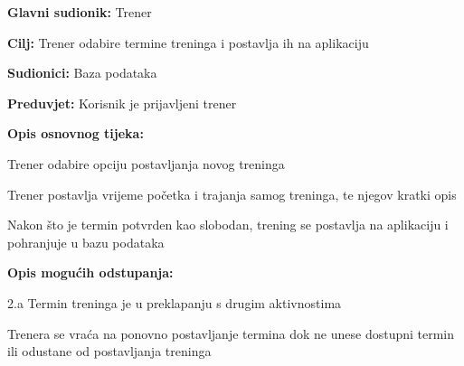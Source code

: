 \documentclass{article}
\begin{document}
		\begin{packed_item}
			
			\item \textbf{Glavni sudionik: }Trener
			\item  \textbf{Cilj:} Trener odabire termine treninga i postavlja ih na aplikaciju   
			\item  \textbf{Sudionici:} Baza podataka
			\item  \textbf{Preduvjet:} Korisnik je prijavljeni trener 
			\item  \textbf{Opis osnovnog tijeka:}
			
			\item[] \begin{packed_enum}
				\item Trener odabire opciju postavljanja novog treninga  
				\item Trener postavlja vrijeme početka i trajanja samog treninga, te njegov kratki opis 
				\item Nakon što je termin potvrden kao slobodan, trening se postavlja na aplikaciju i pohranjuje u bazu podataka 
			\end{packed_enum}
			
			\item  \textbf{Opis mogućih odstupanja:}
			
			\item[] \begin{packed_item}
				
				\item[2.a] Termin treninga je u preklapanju s drugim aktivnostima
				\item[] \begin{packed_enum}
					\item Trenera se vraća na ponovno postavljanje termina dok ne unese dostupni termin ili odustane od postavljanja treninga 
				\end{packed_enum}
			\end{packed_item}
		\end{packed_item}
	
\end{document}
